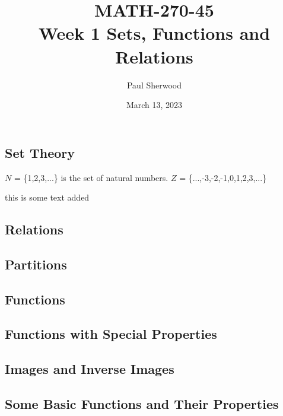 \documentclass{report}
\title{\Huge{MATH-270-45}\\Week 1 Sets, Functions and Relations}
\author{\huge{Paul Sherwood}}
\date{March 13, 2023}
\begin{document}
\maketitle
\newpage%
\tableofcontents
\pagebreak

\chapter{}
\section{Set Theory}


{ $N$ = \{1,2,3,...\} is the set of natural numbers. $Z$ = \{...,-3,-2,-1,0,1,2,3,...\}}


this is some text added
\section{Relations}


\section{Partitions}


\section{Functions}


\section{Functions with Special Properties}


\section{Images and Inverse Images}


\section{Some Basic Functions and Their Properties}
\end{document}
